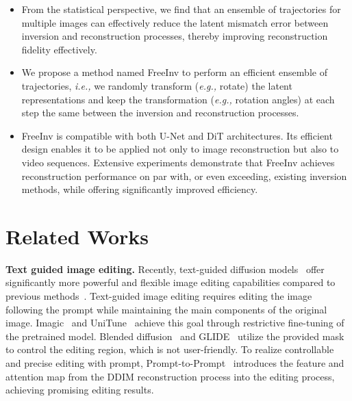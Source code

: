 \documentclass{article}
\begin{document}
\begin{itemize}
    \item From the statistical perspective, we find that an ensemble of trajectories for multiple images can effectively reduce the latent mismatch error between inversion and reconstruction processes, thereby improving reconstruction fidelity effectively. 
    \item We propose a method named FreeInv to perform an efficient ensemble of trajectories, \emph{i.e.,} we randomly transform (\emph{e.g.,} rotate) the latent representations and keep the transformation (\emph{e.g.,} rotation angles) at each step the same between the inversion and reconstruction processes.
    \item FreeInv is compatible with both U-Net and DiT architectures. Its efficient design enables it to be applied not only to image reconstruction but also to video sequences. Extensive experiments demonstrate that FreeInv achieves reconstruction performance on par with, or even exceeding, existing inversion methods, while offering significantly improved efficiency.
    
\end{itemize}


\section{Related Works}
\noindent \textbf{Text guided image editing.}
Recently, text-guided diffusion models~\cite{nichol2022glide, saharia202_imagen, rombach2022high, ho2020denoising, song2021denoising, song2019generative, song2020score} offer significantly more powerful and flexible image editing capabilities compared to previous methods~\cite{Isola2017Image, Zhu2017Unpaired, park2019semantic, patashnik2021styleclip, vinker2021image, Wang2017High, liang2020cpgan, reed2016generative, qiao2019mirrorgan, zhu2019dm, kang2023scaling}.
Text-guided image editing requires editing the image following the prompt while maintaining the main components of the original image.
Imagic~\cite{kawar2023imagic} and UniTune~\cite{valevski2023unitune} achieve this goal through restrictive fine-tuning of the pretrained model.
Blended diffusion~\cite{avrahami2022blended} and GLIDE~\cite{nichol2022glide} utilize the provided mask to control the editing region, which is not user-friendly.
To realize controllable and precise editing with prompt, Prompt-to-Prompt~\cite{hertz2022prompt} introduces the feature and attention map from the DDIM reconstruction process into the editing process, achieving promising editing results. 
\end{document}
